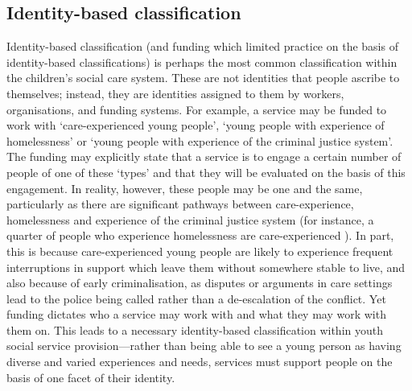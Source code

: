 \subsection{Identity-based classification}
\label{subsec:6-6-1-identity}
Identity-based classification (and funding which limited practice on the basis of identity-based classifications) is perhaps the most common classification within the children's social care system. These are not identities that people ascribe to themselves; instead, they are identities assigned to them by workers, organisations, and funding systems. For example, a service may be funded to work with `care-experienced young people', `young people with experience of homelessness' or `young people with experience of the criminal justice system'. The funding may explicitly state that a service is to engage a certain number of people of one of these `types' and that they will be evaluated on the basis of this engagement. In reality, however, these people may be one and the same, particularly as there are significant pathways between care-experience, homelessness and experience of the criminal justice system (for instance, a quarter of people who experience homelessness are care-experienced \citep{mackie_nations_2014}). In part, this is because care-experienced young people are likely to experience frequent interruptions in support which leave them without somewhere stable to live, and also because of early criminalisation, as disputes or arguments in care settings lead to the police being called rather than a de-escalation of the conflict. Yet funding dictates who a service may work with and what they may work with them on. This leads to a necessary identity-based classification within youth social service provision—rather than being able to see a young person as having diverse and varied experiences and needs, services must support people on the basis of one facet of their identity.

